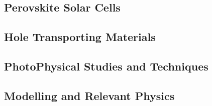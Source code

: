 	\subsection{Perovskite Solar Cells}

	\subsection{Hole Transporting Materials}

	\subsection{PhotoPhysical Studies and Techniques}

	\subsection{Modelling and Relevant Physics}
